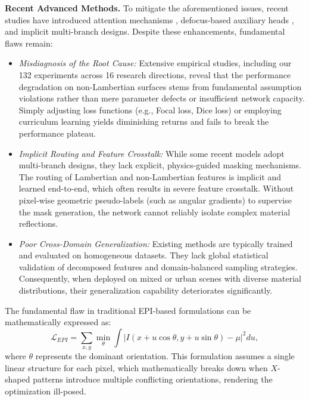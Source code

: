 \documentclass[lettersize,journal]{IEEEtran}
\begin{document}
\textbf{Recent Advanced Methods.} 
To mitigate the aforementioned issues, recent studies have introduced attention mechanisms \cite{wang2021attention}, defocus-based auxiliary heads \cite{huang2021defocus}, and implicit multi-branch designs. Despite these enhancements, fundamental flaws remain:
\begin{itemize}
    \item \textit{Misdiagnosis of the Root Cause:} Extensive empirical studies, including our 132 experiments across 16 research directions, reveal that the performance degradation on non-Lambertian surfaces stems from fundamental assumption violations rather than mere parameter defects or insufficient network capacity. Simply adjusting loss functions (e.g., Focal loss, Dice loss) or employing curriculum learning yields diminishing returns and fails to break the performance plateau.
    \item \textit{Implicit Routing and Feature Crosstalk:} While some recent models adopt multi-branch designs, they lack explicit, physics-guided masking mechanisms. The routing of Lambertian and non-Lambertian features is implicit and learned end-to-end, which often results in severe feature crosstalk. Without pixel-wise geometric pseudo-labels (such as angular gradients) to supervise the mask generation, the network cannot reliably isolate complex material reflections.
    \item \textit{Poor Cross-Domain Generalization:} Existing methods are typically trained and evaluated on homogeneous datasets. They lack global statistical validation of decomposed features and domain-balanced sampling strategies. Consequently, when deployed on mixed or urban scenes with diverse material distributions, their generalization capability deteriorates significantly.
\end{itemize}

The fundamental flaw in traditional EPI-based formulations can be mathematically expressed as:
\begin{equation}
\mathcal{L}_{EPI} = \sum_{x,y} \min_{\theta} \int \left| I(x + u \cos\theta, y + u \sin\theta) - \mu \right|^2 du,
\label{eq:ch1_1}
\end{equation}
where $\theta$ represents the dominant orientation. This formulation assumes a single linear structure for each pixel, which mathematically breaks down when $X$-shaped patterns introduce multiple conflicting orientations, rendering the optimization ill-posed.
\end{document}
